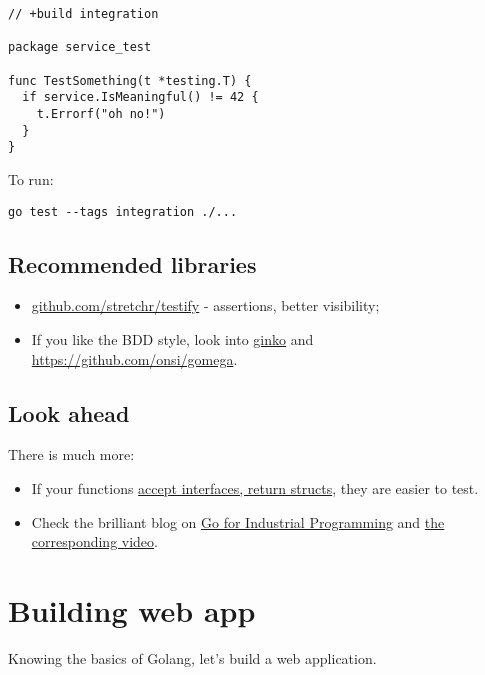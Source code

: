 \documentclass[11pt, letterpaper]{article}
\begin{document}
\begin{verbatim}
// +build integration

package service_test

func TestSomething(t *testing.T) {
  if service.IsMeaningful() != 42 {
    t.Errorf("oh no!")
  }
}
\end{verbatim}

To run:

\begin{verbatim}
go test --tags integration ./...
\end{verbatim}

\subsection{Recommended libraries}

\begin{itemize}
\item \href{https://github.com/stretchr/testify}{github.com/stretchr/testify} - assertions, better visibility;
\item If you like the BDD style, look into \href{https://github.com/onsi/ginkgo}{ginko} and \href{gomega}{https://github.com/onsi/gomega}.
\end{itemize}

\subsection{Look ahead}
There is much more:

\begin{itemize}
\item If your functions \href{https://blog.chewxy.com/2018/03/18/golang-interfaces/}{accept interfaces, return structs}, they are easier to test.
\item Check the brilliant blog on \href{https://peter.bourgon.org/go-for-industrial-programming/}{Go for Industrial Programming} and \href{https://www.youtube.com/watch?v=PTE4VJIdHPg}{the corresponding video}.
\end{itemize}

\pagebreak
\section{Building web app}

Knowing the basics of Golang, let's build a web application.
\end{document}
